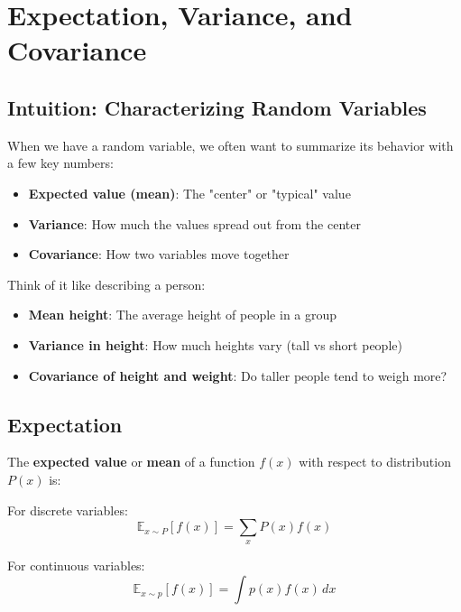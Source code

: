 
\section{Expectation, Variance, and Covariance}
\label{sec:expectation-variance}

\subsection{Intuition: Characterizing Random Variables}

When we have a random variable, we often want to summarize its behavior with a few key numbers:
\begin{itemize}
    \item \textbf{Expected value (mean)}: The "center" or "typical" value
    \item \textbf{Variance}: How much the values spread out from the center
    \item \textbf{Covariance}: How two variables move together
\end{itemize}

Think of it like describing a person:
\begin{itemize}
    \item \textbf{Mean height}: The average height of people in a group
    \item \textbf{Variance in height}: How much heights vary (tall vs short people)
    \item \textbf{Covariance of height and weight}: Do taller people tend to weigh more?
\end{itemize}

\subsection{Expectation}

The \textbf{expected value} or \textbf{mean} of a function $f(x)$ with respect to distribution $P(x)$ is:

For discrete variables:
\begin{equation}
\mathbb{E}_{x \sim P}[f(x)] = \sum_{x} P(x) f(x)
\end{equation}

For continuous variables:
\begin{equation}
\mathbb{E}_{x \sim p}[f(x)] = \int p(x) f(x) \, dx
\end{equation}

